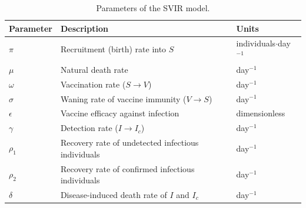 \documentclass[11pt,a4paper]{article}
\begin{document}
\begin{table}[ht]
\centering
\caption{Parameters of the SVIR model.}
\label{tab:parameters}
\begin{tabular}{llp{4.2cm}}
\toprule
\textbf{Parameter} & \textbf{Description} & \textbf{Units} \\
\midrule
\(\pi\)        & Recruitment (birth) rate into \(S\) & individuals\(\cdot\)day\(^{-1}\) \\
\(\mu\)        & Natural death rate & day\(^{-1}\) \\
\(\omega\)     & Vaccination rate (\(S\to V\)) & day\(^{-1}\) \\
\(\sigma\)     & Waning rate of vaccine immunity (\(V\to S\)) & day\(^{-1}\) \\
\(\epsilon\)   & Vaccine efficacy against infection & dimensionless \\
\(\gamma\)     & Detection rate (\(I\to I_c\)) & day\(^{-1}\) \\
\(\rho_1\)     & Recovery rate of undetected infectious individuals & day\(^{-1}\) \\
\(\rho_2\)     & Recovery rate of confirmed infectious individuals & day\(^{-1}\) \\
\(\delta\)     & Disease-induced death rate of \(I\) and \(I_c\) & day\(^{-1}\) \\
\bottomrule
\end{tabular}
\end{table}
\end{document}
